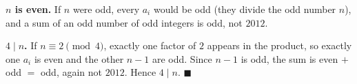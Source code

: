 \textbf{$n$ is even.} If $n$ were odd, every $a_i$ would be odd (they divide the odd number $n$), and a sum of an odd number of odd integers is odd, not $2012$.

\textbf{$4\mid n$.} If $n\equiv2\pmod4$, exactly one factor of $2$ appears in the product, so exactly one $a_i$ is even and the other $n-1$ are odd. Since $n-1$ is odd, the sum is even $+$ odd $=$ odd, again not $2012$. Hence $4\mid n$. $\blacksquare$
